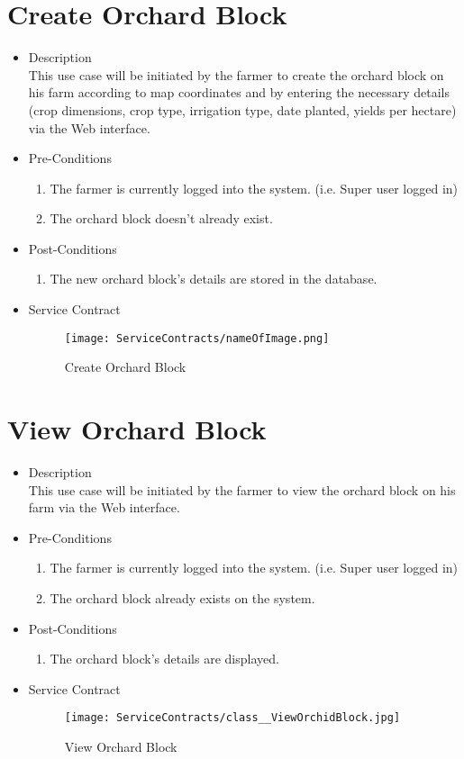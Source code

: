 \documentclass[11pt,fleqn]{book} %
\begin{document}
\section{Create Orchard Block}
\begin{itemize}
	\item Description\\
	This use case will be initiated by the farmer to create the orchard block on his farm according to map coordinates and by entering the necessary details (crop dimensions, crop type, irrigation type, date planted, yields per hectare) via the Web interface.
	\item Pre-Conditions
	\begin{enumerate}
		\item The farmer is currently logged into the system. (i.e. Super user logged in)
		\item The orchard block doesn't already exist.
	\end{enumerate}
	\item Post-Conditions
	\begin{enumerate}
		\item The new orchard block’s details are stored in the database.		
	\end{enumerate}
	\item Service Contract
	\begin{figure}
		\texttt{[image: ServiceContracts/nameOfImage.png]}
		\caption{Create Orchard Block}
	\end{figure}
\end{itemize}

\section{View Orchard Block}
\begin{itemize}
	\item Description\\
	This use case will be initiated by the farmer to view the orchard block on his farm via the Web interface.
	\item Pre-Conditions
	\begin{enumerate}
		\item The farmer is currently logged into the system. (i.e. Super user logged in)
		\item The orchard block already exists on the system.					
	\end{enumerate}
	\item Post-Conditions
	\begin{enumerate}
		\item The orchard block’s details are displayed.
	\end{enumerate}
	\item Service Contract
	\begin{figure}
		\texttt{[image: ServiceContracts/class\_\_ViewOrchidBlock.jpg]}
		\caption{View Orchard Block}
	\end{figure}
\end{itemize}
\end{document}
